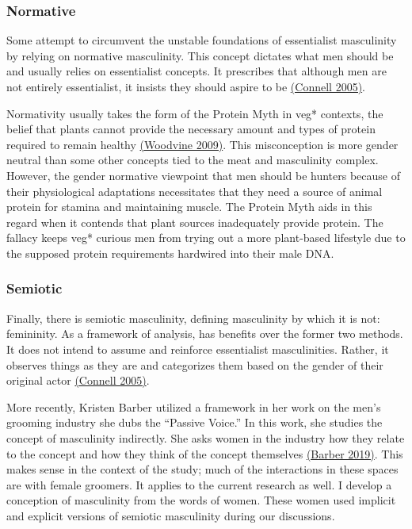 \documentclass[twoside]{report}
\begin{document}
\subsubsection{Normative}

Some attempt to circumvent the unstable foundations of essentialist
masculinity by relying on normative masculinity. This concept dictates
what men should be and usually relies on essentialist concepts. It
prescribes that although men are not entirely essentialist, it insists
they should aspire to be \hyperlink{connell}{(Connell 2005)}.

Normativity usually takes the form of the Protein Myth in veg* contexts, the belief that plants cannot provide the necessary amount and types of protein required to remain healthy \hyperlink{woodvine}{(Woodvine 2009)}. This misconception is more gender neutral than some other concepts tied to the meat and masculinity complex. However, the gender normative viewpoint that men should be hunters because of their physiological adaptations necessitates that they need a source of animal protein for stamina and maintaining muscle. The Protein Myth aids in this regard when it contends that plant sources inadequately provide protein. The fallacy keeps veg* curious men from trying out a more plant-based lifestyle due to the supposed protein requirements hardwired into their male DNA.

\subsubsection{Semiotic}

Finally, there is semiotic masculinity, defining masculinity by which it
is not: femininity. As a framework of analysis, has benefits over the
former two methods. It does not intend to assume and reinforce
essentialist masculinities. Rather, it observes things as they are and
categorizes them based on the gender of their original actor \hyperlink{connell}{(Connell
2005)}.

More recently, Kristen Barber utilized a framework in her work on the
men's grooming industry she dubs the ``Passive Voice.'' In this work,
she studies the concept of masculinity indirectly. She asks women in the
industry how they relate to the concept and how they
think of the concept themselves \hyperlink{barber2}{(Barber 2019)}. This makes sense in the context of the study; much of the interactions in these spaces are with female groomers. It applies to the current research as well. I develop a conception of masculinity from the words of women. These women used
implicit and explicit versions of semiotic masculinity during our
discussions.
\end{document}
